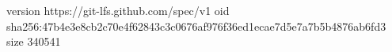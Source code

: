 version https://git-lfs.github.com/spec/v1
oid sha256:47b4e3e8cb2c70e4f62843c3c0676af976f36ed1ecae7d5e7a7b5b4876ab6fd3
size 340541
